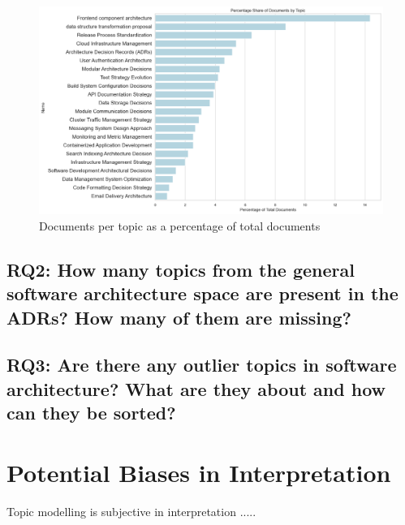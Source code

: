         \begin{figure}[H]
            \centering
            \includegraphics[scale=0.4]{figures/percentage_topics.png}
            \caption{Documents per topic as a percentage of total documents}
            \label{fig:docs_per_topic_percentage}
        \end{figure}


        \subsection{RQ2: How many topics from the general software architecture space are present in the ADRs? How many of them are missing?}

        \subsection{RQ3: Are there any outlier topics in software architecture? What are they about and how can they be sorted?}
        
    \section{Potential Biases in Interpretation}
    Topic modelling is subjective in interpretation ..... 